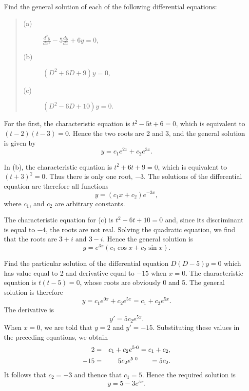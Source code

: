 \begin{example} Find the general solution of each of the following differential equations:
 
\begin{quote}
\begin{description}
\item[(a)] $\frac{d^2y}{dx^2} - 5 \frac{dy}{dx} + 6y = 0,$
\item[(b)] $(D^2 + 6D + 9)y = 0,$
\item[(c)] $(D^2 - 6D + 10)y = 0.$

\end{description}
\end{quote} 

For the first, the characteristic equation is $t^2 - 5t + 6 = 0$, which is equivalent to $(t - 2)(t - 3) = 0$. Hence the two roots are 2 and 3, and the general solution is given by
$$
y = c_1e^{2x} + c_2e^{3x}.
$$

In (b), the characteristic equation is $t^2 + 6t + 9 = 0$, which is equivalent to $(t + 3)^2 = 0$. Thus there is only one root, $- 3$. The solutions of the differential equation are therefore all functions
$$
y = (c_1x + c_2)e^{-3x},
$$
where $c_1$, and $c_2$ are arbitrary constants.

The characteristic equation for (c) is $t^2 - 6t + 10 = 0$ and, since its discriminant is equal to $-4$, the roots are not real. Solving the quadratic equation, we find that the roots are $3 + i$ and $3 - i$. Hence the general solution is
$$
y = e^{3x} (c_1 \cos x + c_2 \sin x).
$$
\end{example}

\begin{example} 
Find the particular solution of the differential equation $D(D - 5)y = 0$ which has value equal to 2 and derivative equal to $-15$ when $x = 0$. The characteristic equation is $t(t - 5) = 0$, whose roots are obviously 0 and 5. The general solution is therefore
$$
y = c_1 e^{0x} + c_2e^{5x} = c_1 + c_2e^{5x}.
$$
The derivative is
$$
y' = 5c_2 e^{5x} .
$$
When $x = 0$, we are told that $y = 2$ and $y' = -15$. Substituting these values in the preceding equations, we obtain
\begin{eqnarray*}
   2 &=& c_1 + c_2 e^{5 \cdot 0} = c_1 + c_2,\\
-15 &=& 5c_2 e^{5 \cdot 0} \hspace{.25in} = 5c_2.
\end{eqnarray*}
It follows that $c_2 = - 3$ and thence that $c_1 = 5$. Hence the required solution is
$$
y = 5 - 3e^{5x}.
$$
\end{example}

